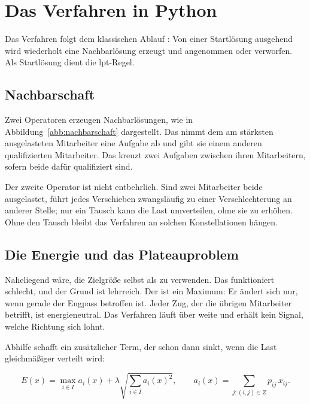\section{Das Verfahren in Python}
\label{sec:python}

Das Verfahren folgt dem klassischen Ablauf
\parencite{kirkpatrick1983optimization}: Von einer Startlösung ausgehend
wird wiederholt eine Nachbarlösung erzeugt und angenommen oder
verworfen. Als Startlösung dient die \ac{lpt}-Regel.

\subsection{Nachbarschaft}

Zwei Operatoren erzeugen Nachbarlösungen, wie in
Abbildung~\ref{abb:nachbarschaft} dargestellt. Das 
nimmt dem am stärksten ausgelasteten Mitarbeiter eine Aufgabe ab und
gibt sie einem anderen qualifizierten Mitarbeiter. Das 
kreuzt zwei Aufgaben zwischen ihren Mitarbeitern, sofern beide dafür
qualifiziert sind.

Der zweite Operator ist nicht entbehrlich. Sind zwei Mitarbeiter beide
ausgelastet, führt jedes Verschieben zwangsläufig zu einer
Verschlechterung an anderer Stelle; nur ein Tausch kann die Last
umverteilen, ohne sie zu erhöhen. Ohne den Tausch bleibt das Verfahren
an solchen Konstellationen hängen.

\subsection{Die Energie und das Plateauproblem}
\label{sec:plateau}

Naheliegend wäre, die Zielgröße selbst als  zu verwenden.
Das funktioniert schlecht, und der Grund ist lehrreich. Der
 ist ein Maximum: Er ändert sich nur, wenn gerade der
Engpass betroffen ist. Jeder Zug, der die übrigen Mitarbeiter betrifft,
ist energieneutral. Das Verfahren läuft über weite  und
erhält kein Signal, welche Richtung sich lohnt.

Abhilfe schafft ein zusätzlicher Term, der schon dann sinkt, wenn die
Last gleichmäßiger verteilt wird:

\begin{equation}
  E(x) = \max_{i \in I} a_i(x)
       + \lambda \sqrt{\sum_{i \in I} a_i(x)^2},
  \qquad
  a_i(x) = \sum_{j:(i,j) \in Z} p_{ij}\, x_{ij}.
  \label{eq:energie}
\end{equation}

